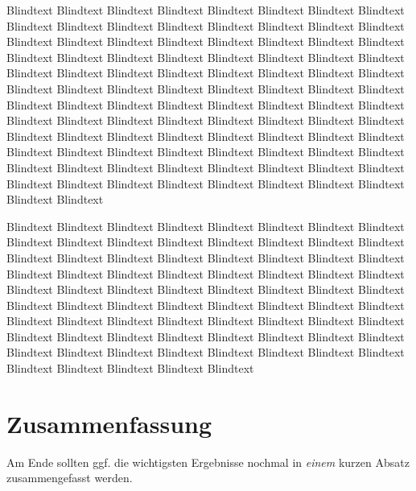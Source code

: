 Blindtext Blindtext Blindtext Blindtext Blindtext Blindtext Blindtext
Blindtext Blindtext Blindtext Blindtext Blindtext Blindtext Blindtext
Blindtext Blindtext Blindtext Blindtext Blindtext Blindtext Blindtext
Blindtext Blindtext Blindtext Blindtext Blindtext Blindtext Blindtext
Blindtext Blindtext Blindtext Blindtext Blindtext Blindtext Blindtext
Blindtext Blindtext Blindtext Blindtext Blindtext Blindtext Blindtext
Blindtext Blindtext Blindtext Blindtext Blindtext Blindtext Blindtext
Blindtext Blindtext Blindtext Blindtext Blindtext Blindtext Blindtext
Blindtext Blindtext Blindtext Blindtext Blindtext Blindtext Blindtext
Blindtext Blindtext Blindtext Blindtext Blindtext Blindtext Blindtext
Blindtext Blindtext Blindtext Blindtext Blindtext Blindtext Blindtext
Blindtext Blindtext Blindtext Blindtext Blindtext Blindtext Blindtext
Blindtext Blindtext Blindtext Blindtext Blindtext Blindtext Blindtext
Blindtext Blindtext Blindtext Blindtext Blindtext Blindtext Blindtext

Blindtext Blindtext Blindtext Blindtext Blindtext Blindtext Blindtext
Blindtext Blindtext Blindtext Blindtext Blindtext Blindtext Blindtext
Blindtext Blindtext Blindtext Blindtext Blindtext Blindtext Blindtext
Blindtext Blindtext Blindtext Blindtext Blindtext Blindtext Blindtext
Blindtext Blindtext Blindtext Blindtext Blindtext Blindtext Blindtext
Blindtext Blindtext Blindtext Blindtext Blindtext Blindtext Blindtext
Blindtext Blindtext Blindtext Blindtext Blindtext Blindtext Blindtext
Blindtext Blindtext Blindtext Blindtext Blindtext Blindtext Blindtext
Blindtext Blindtext Blindtext Blindtext Blindtext Blindtext Blindtext
Blindtext Blindtext Blindtext Blindtext Blindtext Blindtext Blindtext
Blindtext Blindtext Blindtext Blindtext Blindtext Blindtext Blindtext
\section{Zusammenfassung}
\label{ch:Analyse:sec:zusammenfassung}

Am Ende sollten ggf. die wichtigsten Ergebnisse nochmal in \emph{einem}
kurzen Absatz zusammengefasst werden.

